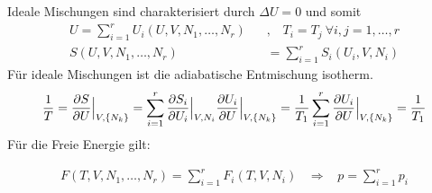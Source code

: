 Ideale Mischungen sind charakterisiert durch $\Delta U = 0$ und somit
\begin{align*}
    U = \sum_{i=1}^r U_i(U,V,N_1,\dots,N_r)
    \hspace{10pt} &, \hspace{10pt}
    T_i = T_j \ \forall
i,j =1,\dots,r
    \\
    S(U,V,N_1,\dots,N_r) &= \sum_{i=1}^r S_i (U_i,V,N_i)
\end{align*}
Für ideale Mischungen ist die adiabatische Entmischung isotherm.
\begin{align*}
    \frac{1}{T} = \frac{\partial S}{\partial U} \Big|_{V,\left\{ N_k \right\}}
    = \sum_{i=1}^r \frac{\partial S_i}{\partial U_i} \Big|_{V,N_i}
        \frac{\partial U_i}{\partial U} \Big|_{V,\left\{ N_k \right\}}
    = \frac{1}{T_1} \sum_{i=1}^r \frac{\partial U_i}{\partial U} \Big|_{V,\left\{ N_k \right\}}
    = \frac{1}{T_1}
\end{align*}
Für die Freie Energie gilt:

\vspace{-10pt}

\begin{align*}
    F(T,V,N_1,\dots,N_r)
    = \sum_{i=1}^r F_i (T,V,N_i)
    \hspace{10pt} \Rightarrow \hspace{10pt}
    p = \sum_{i=1}^r p_i
\end{align*}

\vspace{-5pt}

